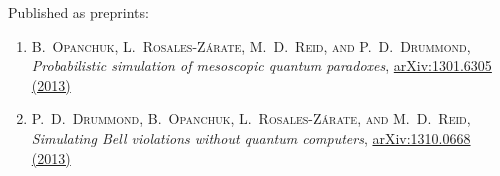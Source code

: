 Published as preprints:

\begin{enumerate}
\item \textsc{B.~Opanchuk, L.~Rosales-Z\'arate, M.~D.~Reid, \textnormal{and} P.~D.~Drummond}, \textit{Probabilistic simulation of mesoscopic quantum paradoxes}, \href{http://arxiv.org/abs/1301.6305}{arXiv:1301.6305 (2013)}

\item \textsc{P.~D.~Drummond, B.~Opanchuk, L.~Rosales-Z\'arate, \textnormal{and} M.~D.~Reid}, \textit{Simulating Bell violations without quantum computers}, \href{http://arxiv.org/abs/1310.0668}{arXiv:1310.0668 (2013)}
\end{enumerate}
